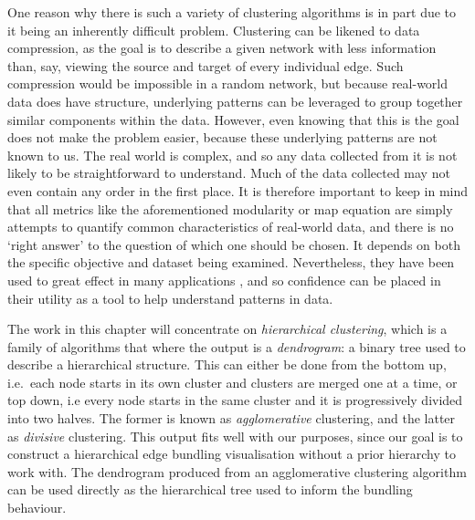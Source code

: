 One reason why there is such a variety of clustering algorithms is in part due to it being an inherently difficult problem.
Clustering can be likened to data compression, as the goal is to describe a given network with less information than, say, viewing the source and target of every individual edge. Such compression would be impossible in a random network, but because real-world data does have structure, underlying patterns can be leveraged to group together similar components within the data.
However, even knowing that this is the goal does not make the problem easier, because these underlying patterns are not known to us. The real world is complex, and so any data collected from it is not likely to be straightforward to understand. Much of the data collected may not even contain any order in the first place.
It is therefore important to keep in mind that all metrics like the aforementioned modularity or map equation are simply attempts to quantify common characteristics of real-world data, and there is no `right answer' to the question of which one should be chosen. It depends on both the specific objective and dataset being examined. Nevertheless, they have been used to great effect in many applications \cite{TODO}, and so confidence can be placed in their utility as a tool to help understand patterns in data.

The work in this chapter will concentrate on \textit{hierarchical clustering}, which is a family of algorithms that where the output is a 
\textit{dendrogram}: a binary tree used to describe a hierarchical structure. This can either be done from the bottom up, i.e.\ each node starts in its own cluster and clusters are merged one at a time, or top down, i.e every node starts in the same cluster and it is progressively divided into two halves. The former is known as \emph{agglomerative} clustering, and the latter as \emph{divisive} clustering.
This output fits well with our purposes, since our goal is to construct a hierarchical edge bundling visualisation without a prior hierarchy to work with. The dendrogram produced from an agglomerative clustering algorithm can be used directly as the hierarchical tree used to inform the bundling behaviour.


